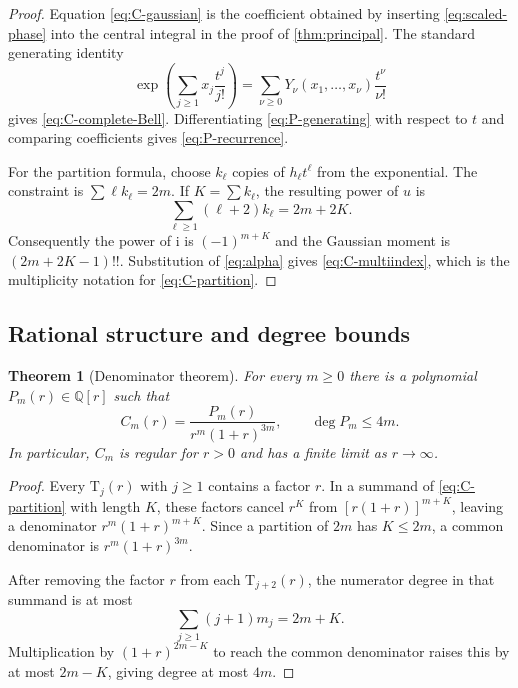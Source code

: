 \documentclass[11pt,a4paper]{article}
\newtheorem{theorem}{Theorem}[section]
\theoremstyle{definition}
\newcommand{\Touch}{\mathrm T}
\newcommand{\ii}{\mathrm i}
\begin{document}
\begin{proof}
Equation \eqref{eq:C-gaussian} is the coefficient obtained by inserting
\eqref{eq:scaled-phase} into the central integral in the proof of
\cref{thm:principal}.  The standard generating identity
\[
 \exp\!\left(\sum_{j\ge1}x_j\frac{t^j}{j!}\right)
 =\sum_{\nu\ge0}Y_\nu(x_1,\ldots,x_\nu)\frac{t^\nu}{\nu!}
\]
gives \eqref{eq:C-complete-Bell}.  Differentiating
\eqref{eq:P-generating} with respect to $t$ and comparing coefficients gives
\eqref{eq:P-recurrence}.

For the partition formula, choose $k_\ell$ copies of $h_\ell t^\ell$ from the
exponential.  The constraint is $\sum\ell k_\ell=2m$.  If
$K=\sum k_\ell$, the resulting power of $u$ is
\[
 \sum_{\ell\ge1}(\ell+2)k_\ell=2m+2K.
\]
Consequently the power of $\ii$ is $(-1)^{m+K}$ and the Gaussian moment is
$(2m+2K-1)!!$.  Substitution of \eqref{eq:alpha} gives
\eqref{eq:C-multiindex}, which is the multiplicity notation for
\eqref{eq:C-partition}.
\end{proof}

\subsection{Rational structure and degree bounds}

\begin{theorem}[Denominator theorem]\label{thm:denominator}
For every $m\ge0$ there is a polynomial $P_m(r)\in\mathbb Q[r]$ such that
\begin{equation}\label{eq:C-rational-structure}
 C_m(r)=\frac{P_m(r)}{r^m(1+r)^{3m}},
 \qquad \deg P_m\le4m.
\end{equation}
In particular, $C_m$ is regular for $r>0$ and has a finite limit as
$r\to\infty$.
\end{theorem}

\begin{proof}
Every $\Touch_j(r)$ with $j\ge1$ contains a factor $r$.  In a summand of
\eqref{eq:C-partition} with length $K$, these factors cancel $r^K$ from
$[r(1+r)]^{m+K}$, leaving a denominator
$r^m(1+r)^{m+K}$.  Since a partition of $2m$ has $K\le2m$, a common
denominator is $r^m(1+r)^{3m}$.

After removing the factor $r$ from each $\Touch_{j+2}(r)$, the numerator degree
in that summand is at most
\[
 \sum_{j\ge1}(j+1)m_j=2m+K.
\]
Multiplication by $(1+r)^{2m-K}$ to reach the common denominator raises this by
at most $2m-K$, giving degree at most $4m$.
\end{proof}
\end{document}

